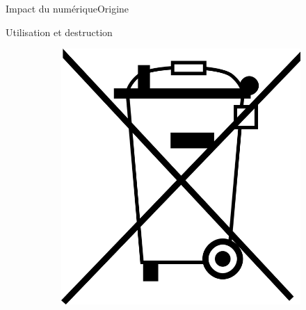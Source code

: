 \begin{frame}{Impact du numérique}{Origine}
\begin{block}{Utilisation et destruction }
\begin{figure}[h!]
\begin{minipage}[b]{0.3\linewidth}
\begin{figure}
    \centering
    \includegraphics[scale=0.06]{Feathergraphics/poubelle.png}
\end{figure}
\end{minipage}
\end{figure}

\end{block}


\end{frame}
